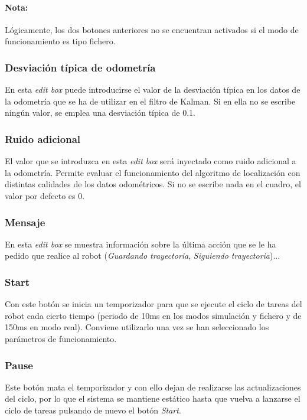 \paragraph{Nota:}
Lógicamente, los dos botones anteriores no se encuentran activados si el modo de funcionamiento es tipo fichero.

\subsubsection{Desviación típica de odometría}
En esta \emph{edit box} puede introducirse el valor de la desviación típica en los datos de la odometría que se ha de utilizar en el filtro de Kalman. Si en ella no se escribe ningún valor, se emplea una desviación típica de 0.1.

\subsubsection{Ruido adicional}
El valor que se introduzca en esta \emph{edit box} será inyectado como ruido adicional a la odometría. Permite evaluar el funcionamiento del algoritmo de localización con distintas calidades de los datos odométricos. Si no se escribe nada en el cuadro, el valor por defecto es 0.

\subsubsection{Mensaje}
En esta \emph{edit box} se muestra información sobre la última acción que se le ha pedido que realice al robot (\emph{Guardando trayectoria}, \emph{Siguiendo trayectoria})...

\subsubsection{Start}
Con este botón se inicia un temporizador para que se ejecute el ciclo de tareas del robot cada cierto tiempo (periodo de 10ms en los modos simulación y fichero y de 150ms en modo real). Conviene utilizarlo una vez se han seleccionado los parámetros de funcionamiento.

\subsubsection{Pause}
Este botón mata el temporizador y con ello dejan de realizarse las actualizaciones del ciclo, por lo que el sistema se mantiene estático hasta que vuelva a lanzarse el ciclo de tareas pulsando de nuevo el botón \emph{Start}.

